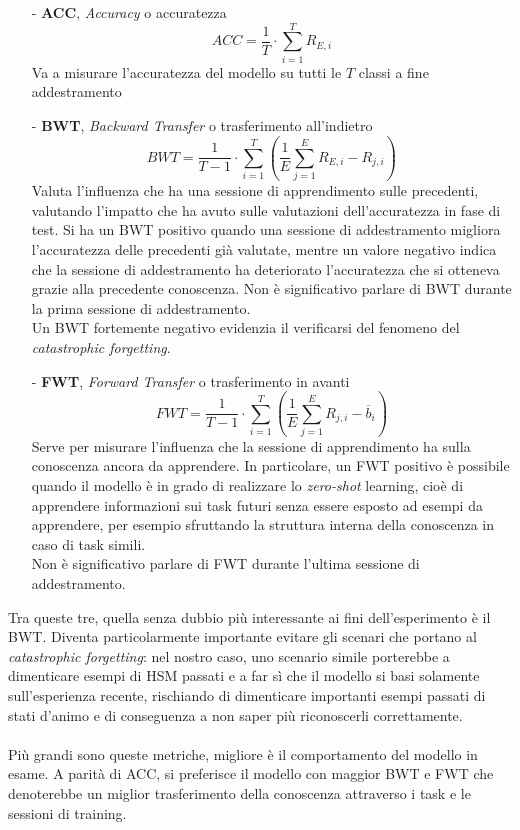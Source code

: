 \begin{itemize}
    \item[-] \textbf{ACC}, \textit{Accuracy} o accuratezza
        \begin{equation}\label{eq:fun_acc}
            ACC = \frac{1}{T}\cdot\sum_{i=1}^T R_{E,i}
        \end{equation}
    Va a misurare l'accuratezza del modello su tutti le $T$ classi a fine addestramento
    \item[-] \textbf{BWT}, \textit{Backward Transfer} o trasferimento all'indietro
        \begin{equation}\label{eq:fun_bwt}
            BWT = \frac{1}{T-1}\cdot\sum_{i=1}^T\left(\frac{1}{E}\sum_{j=1}^E R_{E,i} - R_{j,i}\right)
        \end{equation}
    Valuta l'influenza che ha una sessione di apprendimento sulle precedenti, valutando l'impatto che ha avuto sulle valutazioni dell'accuratezza in fase di test. Si ha un BWT positivo quando una sessione di addestramento migliora l'accuratezza delle precedenti già valutate, mentre un valore negativo indica che la sessione di addestramento ha deteriorato l'accuratezza che si otteneva grazie alla precedente conoscenza. Non è significativo parlare di BWT durante la prima sessione di addestramento.\\
    Un BWT fortemente negativo evidenzia il verificarsi del fenomeno del \textit{catastrophic forgetting}.
    \item[-] \textbf{FWT}, \textit{Forward Transfer} o trasferimento in avanti
        \begin{equation}\label{eq:fun_fwt}
            FWT = \frac{1}{T-1}\cdot\sum_{i=1}^T\left(\frac{1}{E}\sum_{j=1}^E R_{j,i} - \overline{b}_i\right)
        \end{equation}
    Serve per misurare l'influenza che la sessione di apprendimento ha sulla conoscenza ancora da apprendere. In particolare, un FWT positivo è possibile quando il modello è in grado di realizzare lo \textit{zero-shot} learning, cioè di apprendere informazioni sui task futuri senza essere esposto ad esempi da apprendere, per esempio sfruttando la struttura interna della conoscenza in caso di task simili.\\
    Non è significativo parlare di FWT durante l'ultima sessione di addestramento.
\end{itemize}
Tra queste tre, quella senza dubbio più interessante ai fini dell'esperimento è il BWT. Diventa particolarmente importante evitare gli scenari che portano al \textit{catastrophic forgetting}: nel nostro caso, uno scenario simile porterebbe a dimenticare esempi di HSM passati e a far sì che il modello si basi solamente sull'esperienza recente, rischiando di dimenticare importanti esempi passati di stati d'animo e di conseguenza a non saper più riconoscerli correttamente.\\\\
Più grandi sono queste metriche, migliore è il comportamento del modello in esame. A parità di ACC, si preferisce il modello con maggior BWT e FWT che denoterebbe un miglior trasferimento della conoscenza attraverso i task e le sessioni di training.
